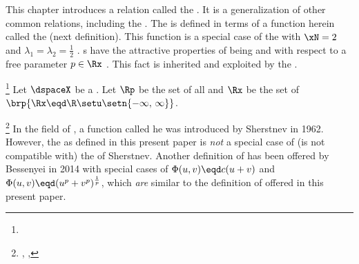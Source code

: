 This chapter introduces a relation called the  .
It is a generalization of other common relations, including the  .
The  is defined in terms of a function herein called the  (next definition).
This function is a special case of the  with $\xN=2$ and $\lambda_1=\lambda_2=\frac{1}{2}$ .
s have the attractive properties of being  and  with respect
to a free parameter $p\in\Rx$ .
This fact is inherited and exploited by the  .
\begin{definition}
\footnote{
  }
\label{def:ptf}
Let $\dspaceX$ be a  .
Let $\Rp$ be the set of all  
and $\Rx$ be the set of  $\brp{\Rx\eqd\R\setu\setn{-\infty,\,\infty}}$. %
\end{definition}

\begin{remark}
\footnote{
  ,
  ,
  }
In the field of , 
a function called he  was introduced by Sherstnev in 1962.
However, the  as defined in this present paper is \emph{not} a special case of
(is not compatible with) the  of Sherstnev.
Another definition of  has been offered by Bessenyei in 2014
with special cases of $\Phi(u,v)\eqd c(u+v)$ and $\Phi(u,v)\eqd(u^p+v^p)^\frac{1}{p}$,
which \emph{are} similar to the definition of  offered in this present paper.
\end{remark}

